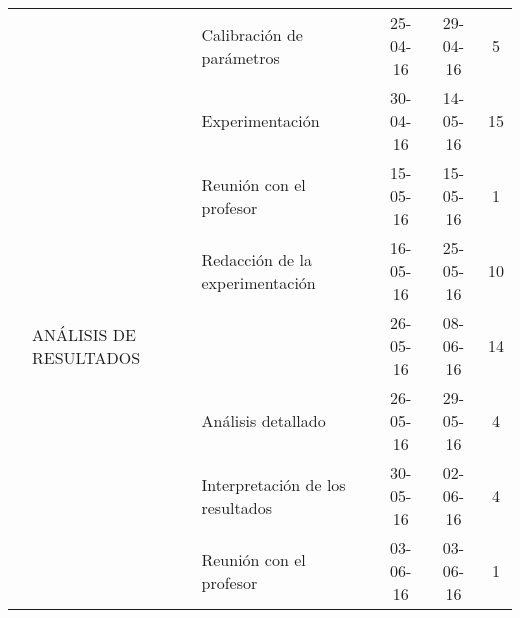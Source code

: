 \begin{table}[H]
{\begin{tabular}{lllccc}
     &                               & Calibración de parámetros                          & 25-04-16                                                           & 29-04-16                                                            & 5                                                                  \\
     &                               & Experimentación                                    & 30-04-16                                                           & 14-05-16                                                            & 15                                                                 \\
     &                               & Reunión con el profesor                            & 15-05-16                                                           & 15-05-16                                                            & 1                                                                  \\
     &                               & Redacción de la experimentación                    & 16-05-16                                                           & 25-05-16                                                            & 10                                                                 \\ \hline
     & ANÁLISIS DE RESULTADOS        &                                                    & 26-05-16                                                           & 08-06-16                                                            & 14                                                                 \\
     &                               & Análisis detallado                                 & 26-05-16                                                           & 29-05-16                                                            & 4                                                                  \\
     &                               & Interpretación de los resultados                   & 30-05-16                                                           & 02-06-16                                                            & 4                                                                  \\
     &                               & Reunión con el profesor                            & 03-06-16                                                           & 03-06-16                                                            & 1                                                                  \\

\end{tabular}}
\end{table}
